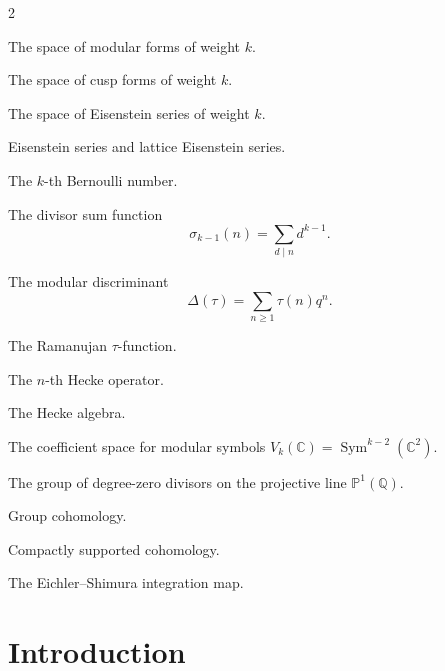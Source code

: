 \documentclass[10pt, a4paper]{article}
\theoremstyle{definition}
\theoremstyle{remark}
\begin{document}
\begin{multicols}{2}
\begin{description}[leftmargin=2.8cm, labelwidth=2.5cm, style=nextline]
\item[\(M_k(\Gamma)\)]
The space of modular forms of weight \(k\).

\item[\(S_k(\Gamma)\)]
The space of cusp forms of weight \(k\).

\item[\(\mathcal E_k(\Gamma)\)]
The space of Eisenstein series of weight \(k\).

\item[\(E_k,G_k\)]
Eisenstein series and lattice Eisenstein series.

\item[\(B_k\)]
The \(k\)-th Bernoulli number.

\item[\(\sigma_{k-1}(n)\)]
The divisor sum function
\[\sigma_{k-1}(n)=\sum_{d\mid n}d^{k-1}.\]

\item[\(\Delta(\tau)\)]
The modular discriminant
\[\Delta(\tau)=\sum_{n\geq1}\tau(n)q^n.\]

\item[\(\tau(n)\)]
The Ramanujan \(\tau\)-function.

\item[\(T_n\)]
The \(n\)-th Hecke operator.

\item[\(\mathbb T\)]
The Hecke algebra.

\item[\(V_k(\mathbb C)\)]
The coefficient space for modular symbols
\(V_k(\mathbb C)=\operatorname{Sym}^{k-2}(\mathbb C^2)\).

\item[\(\Delta^0\)]
The group of degree-zero divisors on the projective line \(\mathbb P^1(\mathbb Q)\).

\item[\(H^1(\Gamma,V_k)\)]
Group cohomology.

\item[\(H_c^1(\Gamma,V_k)\)]
Compactly supported cohomology.

\item[\(\phi_k(f)\)]
The Eichler--Shimura integration map.

\end{description}

\end{multicols}
\endgroup
\newpage
\section{Introduction}
\end{document}
